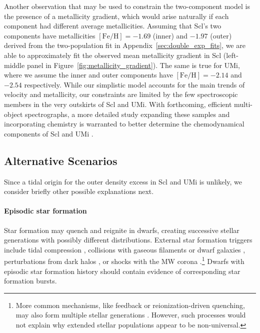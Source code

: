 \documentclass[times,trackchanges, twocolumn, twocolappendix]{aastex701}
\begin{document}
Another observation that may be used to constrain the two-component model is the presence of a metallicity gradient, which would arise naturally if each component had different average metallicities. Assuming that Scl's two components have metallicities $\mathrm{[Fe/H]}=-1.69$ (inner) and $-1.97$ (outer) derived from the two-population fit in Appendix~\ref{sec:double_exp_fits}, we are able to approximately fit the observed mean metallicity gradient in Scl (left-middle panel in Figure~\ref{fig:metallicity_gradient}). The same is true for UMi, where we assume the inner and outer components have $\mathrm{[Fe/H]} = -2.14$ and $-2.54$ respectively. While our simplistic model accounts for the main trends of velocity and metallicity, our constraints are limited by the few spectroscopic members in the very outskirts of Scl and UMi. 
With forthcoming, efficient multi-object spectrographs, a more detailed study expanding these samples and incorporating chemistry is warranted to better determine the chemodynamical components of Scl and UMi \citep[e.g., 4MOST,][]{skuladottir+2023}.




\subsection{Alternative Scenarios} \label{SecAltScen}

Since a tidal origin for the outer density excess in Scl and UMi is unlikely, we  consider briefly other possible explanations next.

\paragraph{Episodic star formation} Star formation may quench and
reignite in dwarfs, creating successive stellar generations with possibly different
distributions. External star formation triggers include tidal
compression \citep{mayer+2001a, dong+lin+murray2003}, collisions with
gaseous filaments or dwarf galaxies \citep{genina+2019}, perturbations from dark halos
\citep{starkenburg+helmi+sales2016}, or shocks with the MW corona
\citep{wright+2019}.\footnote{More common mechanisms, like feedback or
reionization-driven quenching, may also form multiple stellar
generations
\citep{kawata+2006, benitez-llambay+2015, revaz+jablonka2018}. However,
such processes would not explain why extended stellar populations appear
to be non-universal.} Dwarfs with episodic star formation history should
contain evidence of corresponding star formation bursts.
\end{document}

